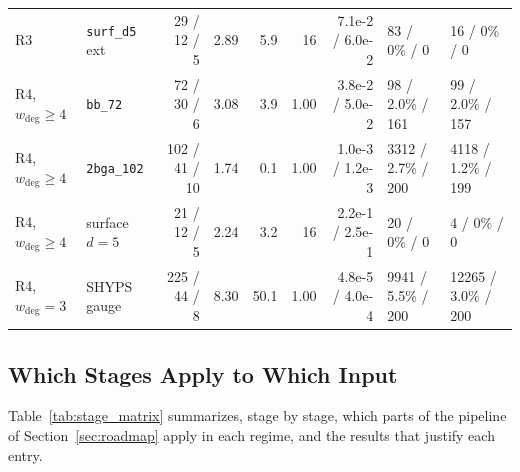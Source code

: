 \documentclass[12pt]{article}
\theoremstyle{definition}
\newcommand{\ttt}[1]{\texttt{#1}}
\begin{document}
\begin{table}[htbp]
\begin{tabular}{@{}llrrrrrll@{}}
R3 & \ttt{surf\_d5} ext & 29 / 12 / 5 & 2.89 & 5.9 & 16 & 7.1e-2 / 6.0e-2 & 83 / 0\% / 0 & 16 / 0\% / 0 \\
R4, $w_{\deg} \ge 4$ & \ttt{bb\_72} & 72 / 30 / 6 & 3.08 & 3.9 & 1.00 & 3.8e-2 / 5.0e-2 & 98 / 2.0\% / 161 &
  99 / 2.0\% / 157 \\
R4, $w_{\deg} \ge 4$ & \ttt{2bga\_102} & 102 / 41 / 10 & 1.74 & 0.1 & 1.00 & 1.0e-3 / 1.2e-3 & 3312 / 2.7\% / 200 &
  4118 / 1.2\% / 199 \\
R4, $w_{\deg} \ge 4$ & surface $d = 5$ & 21 / 12 / 5 & 2.24 & 3.2 & 16 & 2.2e-1 / 2.5e-1 & 20 / 0\% / 0 &
  4 / 0\% / 0 \\
R4, $w_{\deg} = 3$ & SHYPS gauge & 225 / 44 / 8 & 8.30 & 50.1 & 1.00 & 4.8e-5 / 4.0e-4 & 9941 / 5.5\% / 200 &
  12265 / 3.0\% / 200 \\
\bottomrule
\end{tabular}
\end{table}

\subsection{Which Stages Apply to Which Input}\label{subsec:stage_matrix}

Table~\ref{tab:stage_matrix} summarizes, stage by stage, which parts of the pipeline of Section~\ref{sec:roadmap}
apply in each regime, and the results that justify each entry.
\end{document}
